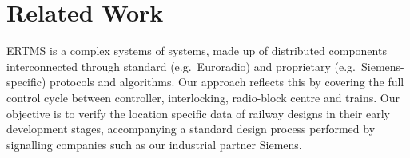 \section{Related Work}
ERTMS is a complex systems of systems, made up of distributed
components interconnected through standard (e.g.\ Euroradio) and
proprietary (e.g.\ Siemens-specific) protocols and algorithms. Our
approach reflects this by covering the full control cycle between
controller, interlocking, radio-block centre and trains. Our objective
is to verify the location specific data of railway designs in their
early development stages, accompanying a standard design process
performed by signalling companies such as our industrial partner
Siemens.




